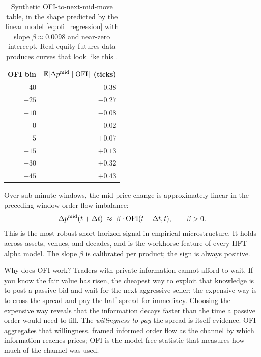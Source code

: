 \begin{table}[htbp]
  \centering
  \begin{tabular}{rr}
    \toprule
    OFI bin & $\mathbb{E}[\Delta p^{\mathrm{mid}} \mid \text{OFI}]$ (ticks) \\
    \midrule
    $-40$ & $-0.38$ \\
    $-25$ & $-0.27$ \\
    $-10$ & $-0.08$ \\
    $\phantom{-}0$   & $-0.02$ \\
    $+5$  & $+0.07$ \\
    $+15$ & $+0.13$ \\
    $+30$ & $+0.32$ \\
    $+45$ & $+0.43$ \\
    \bottomrule
  \end{tabular}
  \caption{Synthetic OFI-to-next-mid-move table, in the shape
  predicted by the linear model \cref{eq:ofi_regression} with
  slope $\beta \approx 0.0098$ and near-zero intercept. Real
  equity-futures data produces curves that look like this
  \citeBouchaud.}
  \label{tab:ofi_bins}
\end{table}

\begin{keyfactbox}
Over sub-minute windows, the mid-price change is approximately
linear in the preceding-window order-flow imbalance:
\[
  \Delta p^{\mathrm{mid}}(t + \Delta t)
  \;\approx\; \beta \cdot \mathrm{OFI}(t - \Delta t, t),
  \qquad \beta > 0.
\]
This is the most robust short-horizon signal in empirical
microstructure. It holds across assets, venues, and decades, and
is the workhorse feature of every HFT alpha model. The slope
$\beta$ is calibrated per product; the sign is always positive.
\end{keyfactbox}

\begin{intuitionbox}
Why does OFI work? Traders with private information cannot
afford to wait. If you know the fair value has risen, the cheapest
way to exploit that knowledge is to post a passive bid and wait
for the next aggressive seller; the expensive way is to cross
the spread and pay the half-spread for immediacy. Choosing the
expensive way reveals that the information decays faster than
the time a passive order would need to fill. The \emph{willingness
to pay} the spread is itself evidence. OFI aggregates that
willingness.  framed informed order flow as the
channel by which information reaches prices; OFI is the
model-free statistic that measures how much of the channel was
used.
\end{intuitionbox}

